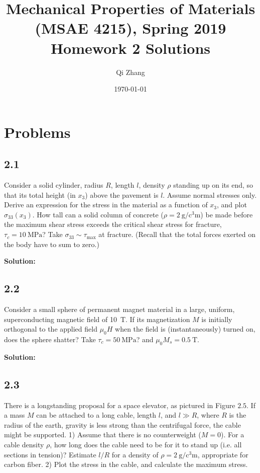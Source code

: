 \documentclass[12pt]{article}
\begin{document}

\title{Mechanical Properties of Materials (MSAE 4215), Spring 2019\\ Homework 2 Solutions}
\author{Qi Zhang}
\date{\today}

\maketitle

\tableofcontents
\listoffigures
\listoftables

\section{Problems}
\subsection{2.1}
Consider a solid cylinder, radius $R$, length $l$, density $\rho$ standing up on its end,
so that its total height (in $x_3$) above the pavement is $l$. Assume normal stresses only.
Derive an expression for the stress in the material as a function of $x_3$, and
plot $\sigma_{33}(x_3)$. How tall can a solid column of concrete ($\rho = \SI{2}{\gram\per\cubic\centi\meter}$)
be made before the maximum shear stress exceeds the critical shear stress for
fracture, $\tau_c = \SI{10}{\mega\pascal}$? Take $\sigma_{33} \sim \tau_\text{max}$ at fracture.
(Recall that the total forces exerted on the body have to sum to zero.)

\textbf{Solution:}





\subsection{2.2}
Consider a small sphere of  permanent magnet material in a large,
uniform, superconducting magnetic field of \SI{10}{\tesla}. If its magnetization $M$
is initially orthogonal to the applied field $\mu_0 H$ when the field is (instantaneously)
turned on, does the sphere shatter? Take $\tau_c = \SI{50}{\mega\pascal}$? and
$\mu_0 M_s = \SI{0.5}{\tesla}$.

\textbf{Solution:}


\subsection{2.3}
There is a longstanding proposal for a space elevator, as pictured in
Figure $2.5$. If a mass $M$ can be attached to a long cable, length $l$, and $l \gg R$,
where $R$ is the radius of the earth, gravity is less strong than the centrifugal force,
the cable might be supported.
1) Assume that there is no counterweight ($M = 0$). For a cable density $\rho$,
how long does the cable need to be for it to stand up (i.e. all sections in tension)?
Estimate $l/R$ for a density of $\rho = \SI{2}{\gram\per\cubic\centi\meter}$,
appropriate for carbon fiber. 2) Plot the stress in the cable, and calculate the
maximum stress.
\end{document}
